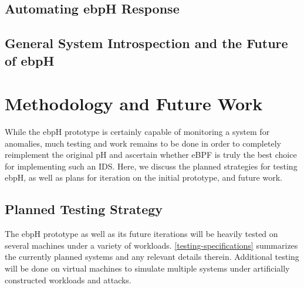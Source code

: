 \documentclass[
  12pt]{findlay}
\begin{document}
\hypertarget{automating-ebph-response}{%
\subsection{Automating ebpH Response}\label{automating-ebph-response}}

\hypertarget{general-system-introspection-and-the-future-of-ebph}{%
\subsection{General System Introspection and the Future of
ebpH}\label{general-system-introspection-and-the-future-of-ebph}}

\hypertarget{methodology-and-future-work}{%
\section{Methodology and Future
Work}\label{methodology-and-future-work}}

While the ebpH prototype is certainly capable of monitoring a system for
anomalies, much testing and work remains to be done in order to
completely reimplement the original pH and ascertain whether eBPF is
truly the best choice for implementing such an IDS. Here, we discuss the
planned strategies for testing ebpH, as well as plans for iteration on
the initial prototype, and future work.

\hypertarget{planned-testing-strategy}{%
\subsection{Planned Testing Strategy}\label{planned-testing-strategy}}

The ebpH prototype as well as its future iterations will be heavily
tested on several machines under a variety of workloads.
\autoref{testing-specifications} summarizes the currently planned
systems and any relevant details therein. Additional testing will be
done on virtual machines to simulate multiple systems under artificially
constructed workloads and attacks.
\end{document}

